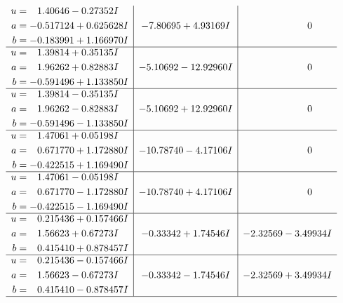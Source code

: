 \documentclass[1p]{elsarticle_modified}
\theoremstyle{definition}
\begin{document}
$$\begin{array}{c|c|c}
\begin{aligned}
u &= \phantom{-}1.40646 - 0.27352 I \\
a &= -0.517124 + 0.625628 I \\
b &= -0.183991 + 1.166970 I\end{aligned}
 & -7.80695 + 4.93169 I & \phantom{-0.000000 } 0 \\ \hline\begin{aligned}
u &= \phantom{-}1.39814 + 0.35135 I \\
a &= \phantom{-}1.96262 + 0.82883 I \\
b &= -0.591496 + 1.133850 I\end{aligned}
 & -5.10692 - 12.92960 I & \phantom{-0.000000 } 0 \\ \hline\begin{aligned}
u &= \phantom{-}1.39814 - 0.35135 I \\
a &= \phantom{-}1.96262 - 0.82883 I \\
b &= -0.591496 - 1.133850 I\end{aligned}
 & -5.10692 + 12.92960 I & \phantom{-0.000000 } 0 \\ \hline\begin{aligned}
u &= \phantom{-}1.47061 + 0.05198 I \\
a &= \phantom{-}0.671770 + 1.172880 I \\
b &= -0.422515 + 1.169490 I\end{aligned}
 & -10.78740 - 4.17106 I & \phantom{-0.000000 } 0 \\ \hline\begin{aligned}
u &= \phantom{-}1.47061 - 0.05198 I \\
a &= \phantom{-}0.671770 - 1.172880 I \\
b &= -0.422515 - 1.169490 I\end{aligned}
 & -10.78740 + 4.17106 I & \phantom{-0.000000 } 0 \\ \hline\begin{aligned}
u &= \phantom{-}0.215436 + 0.157466 I \\
a &= \phantom{-}1.56623 + 0.67273 I \\
b &= \phantom{-}0.415410 + 0.878457 I\end{aligned}
 & -0.33342 + 1.74546 I & -2.32569 - 3.49934 I \\ \hline\begin{aligned}
u &= \phantom{-}0.215436 - 0.157466 I \\
a &= \phantom{-}1.56623 - 0.67273 I \\
b &= \phantom{-}0.415410 - 0.878457 I\end{aligned}
 & -0.33342 - 1.74546 I & -2.32569 + 3.49934 I\\
 \hline 
 \end{array}$$\newpage\newpage\renewcommand{\arraystretch}{1}
\end{document}
